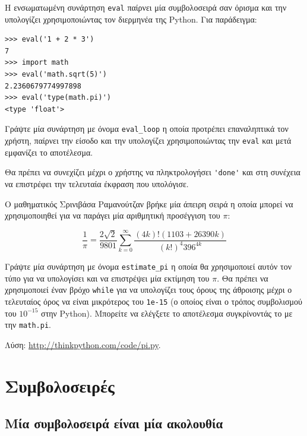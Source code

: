 \documentclass[10pt]{book}
\begin{document}
\begin{exercise}

Η ενσωματωμένη συνάρτηση {\tt eval} παίρνει μία συμβολοσειρά σαν όρισμα και την
υπολογίζει χρησιμοποιώντας τον διερμηνέα της Python. Για παράδειγμα:

\begin{verbatim}
>>> eval('1 + 2 * 3')
7
>>> import math
>>> eval('math.sqrt(5)')
2.2360679774997898
>>> eval('type(math.pi)')
<type 'float'>
\end{verbatim}
%

Γράψτε μία συνάρτηση με όνομα \verb"eval_loop" η οποία προτρέπει
επαναληπτικά τον χρήστη, παίρνει την είσοδο και την υπολογίζει χρησιμοποιώντας
την {\tt eval} και μετά εμφανίζει το αποτέλεσμα.

Θα πρέπει να συνεχίζει μέχρι ο χρήστης να πληκτρολογήσει \verb"'done'" και
στη συνέχεια να επιστρέφει την τελευταία έκφραση που υπολόγισε.
\\
\end{exercise}


\begin{exercise}

Ο μαθηματικός Σρινιβάσα Ραμανούτζαν βρήκε μία άπειρη σειρά η οποία μπορεί να
χρησιμοποιηθεί για να παράγει μία αριθμητική προσέγγιση του $\pi$:

\[ \frac{1}{\pi} = \frac{2\sqrt{2}}{9801}
\sum^\infty_{k=0} \frac{(4k)!(1103+26390k)}{(k!)^4 396^{4k}} \]


Γράψτε μία συνάρτηση με όνομα \verb"estimate_pi" η οποία θα χρησιμοποιεί αυτόν
τον τύπο για να υπολογίσει και να επιστρέψει μία εκτίμηση του $\pi$. Θα πρέπει
να χρησιμοποιεί έναν βρόχο {\tt while} για να υπολογίζει τους όρους της άθροισης μέχρι ο τελευταίος όρος να είναι μικρότερος του {\tt 1e-15} (ο οποίος είναι ο τρόπος συμβολισμού του $10^{-15}$ στην Python). Μπορείτε να ελέγξετε το αποτέλεσμα συγκρίνοντάς το με την {\tt math.pi}.

Λύση: \url{http://thinkpython.com/code/pi.py}.

\end{exercise}



\chapter{Συμβολοσειρές}
\label{strings}


\section{Μία συμβολοσειρά είναι μία ακολουθία}
\end{document}
